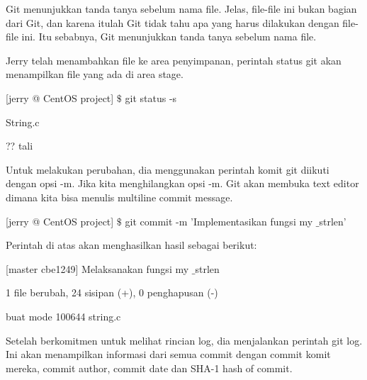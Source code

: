  \vspace{\baselineskip}
\noindent 
Git menunjukkan tanda tanya sebelum nama file. Jelas, file-file ini bukan bagian dari Git, dan karena itulah Git tidak tahu apa yang harus dilakukan dengan file-file ini. Itu sebabnya, Git menunjukkan tanda tanya sebelum nama file. \par
\noindent 
Jerry telah menambahkan file ke area penyimpanan, perintah status git akan menampilkan file yang ada di area stage. \par
\vspace{\baselineskip}
\noindent 
 \hspace*{0.5in} [jerry @ CentOS project]  $  \$  $ git status -s \par
\noindent 
 \hspace*{0.5in} String.c \par
\noindent 
 \hspace*{0.5in} ?? tali \par
 \vspace{\baselineskip}
\noindent 
 \hspace*{0.5in} Untuk melakukan perubahan, dia menggunakan perintah komit git diikuti dengan opsi -m. Jika kita menghilangkan opsi -m. Git akan membuka text editor dimana kita bisa menulis multiline commit message. \par
 \vspace{\baselineskip}
\noindent 
 \hspace*{0.5in} [jerry @ CentOS project]  $  \$  $ git commit -m 'Implementasikan fungsi my $  \_  $strlen' \par
\noindent 
 \hspace*{0.5in} Perintah di atas akan menghasilkan hasil sebagai berikut: \par
\noindent 
 \hspace*{0.5in} [master cbe1249] Melaksanakan fungsi my $  \_  $strlen \par
\noindent 
 \hspace*{0.5in} 1 file berubah, 24 sisipan (+), 0 penghapusan (-) \par
\noindent 
 \hspace*{0.5in} buat mode 100644 string.c \par
 \vspace{\baselineskip}
\noindent 
Setelah berkomitmen untuk melihat rincian log, dia menjalankan perintah git log. Ini akan menampilkan informasi dari semua commit dengan commit komit mereka, commit author, commit date dan SHA-1 hash of commit. \par
